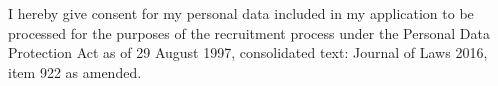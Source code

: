\documentclass[11pt, a4paper]{awesome-cv}
\begin{document}
\makecvheader[C]

\vspace{-1mm}
\makecvfooter
  {}
  {I hereby give consent for my personal data included in my application to be processed for the purposes of the recruitment process under the Personal Data Protection Act as of 29 August 1997, consolidated text: Journal of Laws 2016, item 922 as amended.}
  {}

\makelettertitle

\end{document}
